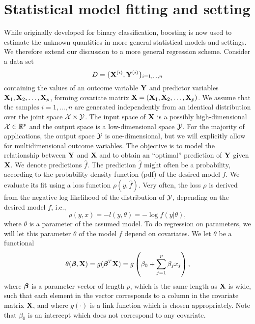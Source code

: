 \section{Statistical model fitting and setting}
While originally developed for binary classification, boosting is now used to estimate the unknown quantities in more general statistical models and settings. We therefore extend our discussion to a more general regression scheme. Consider a data set
\begin{equation}
    D=\{\mathbf{X}^{(i)},\mathbf{Y}^{(i)}\}_{i=1,\ldots,n}
\end{equation}
containing the values of an outcome variable $\mathbf{Y}$ and predictor variables $\mathbf{X}_1, \mathbf{X}_2,\ldots,\mathbf{X}_p$, forming covariate matrix $\mathbf{X}=(\mathbf{X}_1, \mathbf{X}_2,\ldots,\mathbf{X}_p)$. We assume that the samples $i=1,\ldots,n$ are generated independently from an identical distribution over the joint space $\mathcal{X}\times\mathcal{Y}$. The input space of $\mathbf{X}$ is a possibly high-dimensional $\mathcal{X}\in\mathbb{R}^p$ and the output space is a low-dimensional space $\mathcal{Y}$. For the majority of applications, the output space $\mathcal{Y}$ is one-dimensional, but we will explicitly allow for multidimensional outcome variables. The objective is to model the relationship between $\mathbf{Y}$ and $\mathbf{X}$ and to obtain an ``optimal'' prediction of $\mathbf{Y}$ given $\mathbf{X}$. We denote predictions $\hat{f}$. The prediction $\hat{f}$ might often be a probability, according to the probability density function (pdf) of the desired model $f$. We evaluate its fit using a loss function $\rho(y,\hat{f})$. Very often, the loss $\rho$ is derived from the negative log likelihood of the distribution of $\mathcal{Y}$, depending on the desired model $f$, i.e.,
\begin{equation}
    \rho(y,x)=-l(y,\theta)=-\log{f(y|\theta)},
\end{equation}
where $\theta$ is a parameter of the assumed model. To do regression on parameters, we will let this parameter $\theta$ of the model $f$ depend on covariates. We let $\theta$ be a functional
\begin{equation}
    \theta(\boldsymbol{\beta},\mathbf{X})=g(\boldsymbol{\beta}^T\mathbf{X})=g\left(\beta_0+\sum_{j=1}^p\beta_jx_j\right),
\end{equation}
where $\boldsymbol{\beta}$ is a parameter vector of length $p$, which is the same length as $\mathbf{X}$ is wide, such that each element in the vector corresponds to a column in the covariate matrix $\mathbf{X}$, and where $g(\cdot)$ is a link function which is chosen appropriately. Note that $\beta_0$ is an intercept which does not correspond to any covariate.

